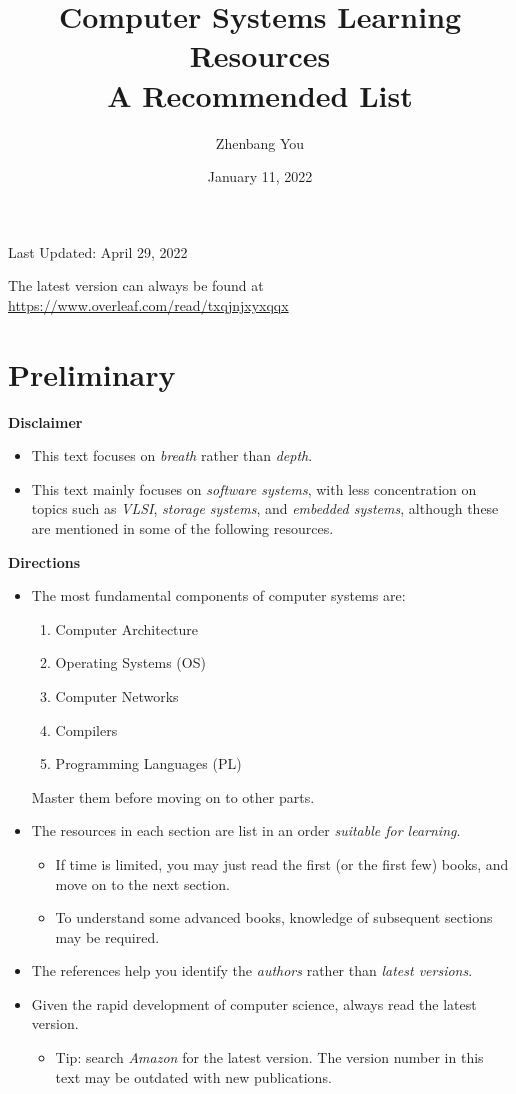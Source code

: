 \documentclass{article}
\title{\Huge{Computer Systems Learning Resources}\\ \huge{A Recommended List}}
\author{Zhenbang You}
\date{January 11, 2022}
\begin{document}
\maketitle

\centerline{\large{Last Updated: April 29, 2022}}

\vspace{20pt}

The latest version can always be found at \href{https://www.overleaf.com/read/txqjnjxyxqqx
}{https://www.overleaf.com/read/txqjnjxyxqqx
}

\section{Preliminary}

\textbf{Disclaimer}
\begin{itemize}
    \item This text focuses on \emph{breath} rather than \emph{depth}.
    \item This text mainly focuses on \emph{software systems}, with less concentration on topics such as \emph{VLSI}, \emph{storage systems}, and \emph{embedded systems}, although these are mentioned in some of the following resources.
\end{itemize}

\noindent
\textbf{Directions}
\begin{itemize}
    \item The most fundamental components of computer systems are:
    \begin{enumerate}
        \item Computer Architecture
        \item Operating Systems (OS)
        \item Computer Networks
        \item Compilers
        \item Programming Languages (PL)
    \end{enumerate}
    Master them before moving on to other parts.
    \item The resources in each section are list in an order \emph{suitable for learning}.
    \begin{itemize}
        \item If time is limited, you may just read the first (or the first few) books, and move on to the next section.
        \item To understand some advanced books, knowledge of subsequent sections may be required.
    \end{itemize}
    \item The references help you identify the \emph{authors} rather than \emph{latest versions}.
    \item Given the rapid development of computer science, always read the latest version.
    \begin{itemize}
        \item Tip: search \emph{Amazon} for the latest version. The version number in this text may be outdated with new publications.
    \end{itemize}
\end{itemize}
\end{document}
